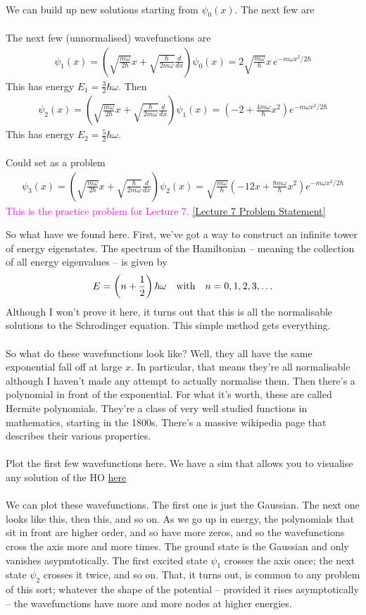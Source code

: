 \documentclass[12pt]{article}
\def\be{\begin{eqnarray}}
\def\ee{\end{eqnarray}}
\newcommand{\nn}{\nonumber}
\newcommand\para{\paragraph{}}
\newcommand{\co}{\color{olive}}
\newcommand{\cblue}{\color{blue}}
\newcommand{\alyssa}{\textcolor{magenta}}
\begin{document}
\para
{\co We can build up new solutions starting from $\psi_0(x)$. The next few are
%
\para
The next few (unnormalised) wavefunctions are
%
\be \psi_1(x)  = \left(\sqrt{\frac{m\omega}{2\hbar}}x +\sqrt{\frac{\hbar}{2m\omega}}\frac{d}{dx}\right)\psi_0(x) = 2\sqrt{\frac{m\omega}{\hbar}}  x \,e^{-m\omega x^2/2\hbar}\nn\ee
%
This has energy $E_1= \frac{3}{2}\hbar\omega$.  Then
%
\be \psi_2(x)  = \left(\sqrt{\frac{m\omega}{2\hbar}}x +\sqrt{\frac{\hbar}{2m\omega}}\frac{d}{dx}\right)\psi_1(x) = \left(-2+\frac{4m\omega}{\hbar}x^2\right)e^{-m\omega x^2/2\hbar} \nn\ee
%
This has energy $E_2=\frac{5}{2}\hbar\omega$.}

\para
{\cblue Could set as a problem
\be
\psi_3(x) =  \left(\sqrt{\frac{m\omega}{2\hbar}}x +\sqrt{\frac{\hbar}{2m\omega}}\frac{d}{dx}\right)\psi_2(x) =  \sqrt{\frac{m\omega}{\hbar}}\left(-12x +\frac{8m\omega}{\hbar}x^2\right)e^{-m\omega x^2/2\hbar} \nn\ee
%
} \alyssa{This is the practice problem for Lecture 7.} \href{https://drive.google.com/file/d/1UBXGh8inxjkUpZ_Nq9do-vqrjMrkI7Xu/view?usp=drive_link}{[Lecture 7 Problem Statement]}

So what have we found here. First, we've got a way to construct an infinite tower of energy eigenstates. {\co The spectrum of the Hamiltonian} -- meaning the collection of all energy eigenvalues -- {\co is given by
%
\be E = \left(n+\frac{1}{2}\right) \hbar \omega\ \ \ {\rm with}\ \ \ n=0,1,2,3,\ldots\nn\ee
%
}
Although I won't prove it here, it turns out that this is all the normalisable solutions to the Schrodinger equation. This simple method gets everything.

\para
So what do these wavefunctions look like? Well, they all have the same exponential fall off at large $x$. In particular, that means they're all normalisable although I haven't made any attempt to actually normalise them. Then there's a polynomial in front of the exponential. For what it's worth, these are called Hermite polynomials. They're a class of very well studied functions in mathematics, starting in the 1800s. There's a massive wikipedia page that describes their various properties.


\para
{\cblue Plot the first few wavefunctions here. We have a sim that allows you to visualise any solution of the HO \href{https://capacity-simulations.github.io/simulations/harmonic-oscillator_2.html}{here} }

\para
We can plot these wavefunctions. The first one is just the Gaussian. The next one looks like this, then this, and so on. As we go up in energy, the polynomials that sit in front are higher order, and so have more zeros, and so the wavefunctions cross the axis more and more times. The ground state is the Gaussian and only vanishes asypmtotically. The first excited state $\psi_1$ crosses the axis once; the next state $\psi_2$ crosses it twice, and so on. That, it turns out, is common to any problem of this sort; whatever the shape of the potential -- provided it rises asymptotically -- the wavefunctions have more and more nodes at higher energies. 
\end{document}
